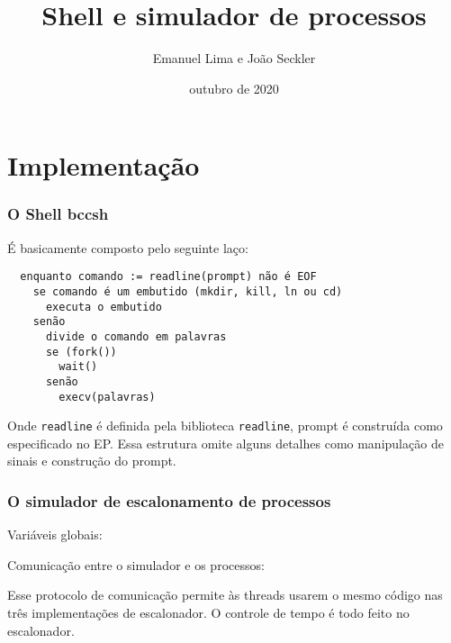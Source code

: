 \documentclass{beamer}
\title[EP1]{Shell e simulador de processos}
\author{Emanuel Lima e João Seckler}
\date{outubro de 2020}
\begin{document}
\frame{\titlepage}

\section{Implementação}
\begin{frame}[fragile]
  \frametitle{O Shell bccsh}

  É basicamente composto pelo seguinte laço:

  \begin{verbatim}
  enquanto comando := readline(prompt) não é EOF
    se comando é um embutido (mkdir, kill, ln ou cd)
      executa o embutido
    senão
      divide o comando em palavras
      se (fork())
        wait()
      senão
        execv(palavras)

  \end{verbatim}

  Onde \verb/readline/ é definida pela biblioteca \verb/readline/,
  prompt é construída como especificado no EP. Essa estrutura omite
  alguns detalhes como manipulação de sinais e construção do prompt.

\end{frame}

\begin{frame}[fragile]
  \frametitle{O simulador de escalonamento de processos}
  Variáveis globais:
  Comunicação entre o simulador e os processos:
  Esse protocolo de comunicação permite às threads usarem o mesmo código
  nas três implementações de escalonador. O controle de tempo é todo
  feito no escalonador.
\end{frame}
\end{document}
